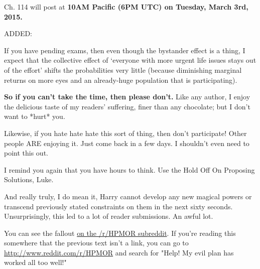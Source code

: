\vspace*{.5\baselineskip}\noindent
Ch. 114 will post at \textbf{10AM Pacific (6PM UTC) on Tuesday, March
3rd, 2015.}

\vspace*{.5\baselineskip}\noindent
ADDED:

\vspace*{.5\baselineskip}\noindent
If you have pending exams,
then even though the bystander effect is a thing,
I expect that the collective effect of
`everyone with more urgent life issues stays out of the effort'
shifts the probabilities very little
(because diminishing marginal returns on more eyes
and an already-huge population that is participating).

\vspace*{.5\baselineskip}\noindent
\textbf{So if you can't take the time, then please don't.}
Like any author, I enjoy the delicious taste of my readers' suffering,
finer than any chocolate; but I don't want to *hurt* you.

\vspace*{.5\baselineskip}\noindent
Likewise, if you hate hate hate this sort of thing, then don't
participate!
Other people ARE enjoying it. Just come back in a few days.
I shouldn't even need to point this out.

\vspace*{.5\baselineskip}\noindent
I remind you again that you have hours to think.
Use the Hold Off On Proposing Solutions, Luke.

\vspace*{.5\baselineskip}\noindent
And really truly, I do mean it,
Harry cannot develop any new magical powers
or transcend previously stated constraints on them
in the next sixty seconds.
\later
Unsurprisingly, this led to a lot of reader submissions. An awful lot.

You can see the
fallout \href{http://www.reddit.com/r/HPMOR/comments/2xnyi0/113_help_my_evil_plan_has_worked_all_too_well/}{on the /r/HPMOR subreddit}. 
If you're reading this somewhere that the previous text isn't a link, you 
can go to \url{http://www.reddit.com/r/HPMOR} and search for "Help! My evil plan has worked all too well!"

